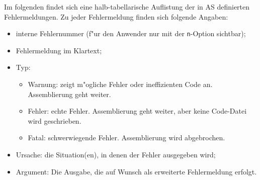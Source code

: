 \documentclass[12pt,a4paper,twoside]{report}
\newcommand{\tty}[1]{{\tt #1}}
\begin{document}
{Im folgenden findet sich eine halb-tabellarische Auflistung der in AS
definierten Fehlermeldungen.  Zu jeder Fehlermeldung finden sich folgende
Angaben:
\begin{itemize}
\item{interne Fehlernummer (f"ur den Anwender nur mit der \tty{n}-Option sichtbar);}
\item{Fehlermeldung im Klartext;}
\item{Typ:
      \begin{itemize}
      \item{Warnung: zeigt m"ogliche Fehler oder ineffizienten Code an.
            Assemblierung geht weiter.}
      \item{Fehler: echte Fehler.  Assemblierung geht weiter, aber keine
            Code-Datei wird geschrieben.}
      \item{Fatal: schwerwiegende Fehler.  Assemblierung wird abgebrochen.}
      \end{itemize}}
\item{Ursache: die Situation(en), in denen der Fehler ausgegeben
      wird;}
\item{Argument: Die Ausgabe, die auf Wunsch als erweiterte Fehlermeldung
      erfolgt.}
\end{itemize}

\par

\newcommand{\errentry}[5]
           {\item[#1]{#2 
                      \begin{description}
                      \item[Type:]{\ \\#3} 
                      \item[Reason:]{\ \\#4}
                      \item[Argument:]{\ \\#5}
                      \end{description}}
           }

}
\end{document}

